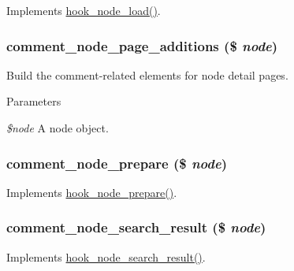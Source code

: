 Implements \hyperlink{group__node__api__hooks_gad48bb14b68ed38526029d1f7ac2d2de4}{hook\_\-node\_\-load()}. \hypertarget{comment_8module_a6244e5c333fc28d69fd0283dd62935bc}{
\subsubsection[{comment\_\-node\_\-page\_\-additions}]{\setlength{\rightskip}{0pt plus 5cm}comment\_\-node\_\-page\_\-additions (\$ {\em node})}}
\label{comment_8module_a6244e5c333fc28d69fd0283dd62935bc}
Build the comment-\/related elements for node detail pages.


\begin{DoxyParams}{Parameters}
\item[{\em \$node}]A node object. \end{DoxyParams}
\hypertarget{comment_8module_ad676dbb6ef26ede2da251447dc02f692}{
\subsubsection[{comment\_\-node\_\-prepare}]{\setlength{\rightskip}{0pt plus 5cm}comment\_\-node\_\-prepare (\$ {\em node})}}
\label{comment_8module_ad676dbb6ef26ede2da251447dc02f692}
Implements \hyperlink{group__node__api__hooks_ga4bbe7320bd52fc6183920c8be2d9d4f6}{hook\_\-node\_\-prepare()}. \hypertarget{comment_8module_a2f8892368f9c2044dab49523e87bbf7e}{
\subsubsection[{comment\_\-node\_\-search\_\-result}]{\setlength{\rightskip}{0pt plus 5cm}comment\_\-node\_\-search\_\-result (\$ {\em node})}}
\label{comment_8module_a2f8892368f9c2044dab49523e87bbf7e}
Implements \hyperlink{group__node__api__hooks_ga8644320a0e04e3a503c99626d4223725}{hook\_\-node\_\-search\_\-result()}.

